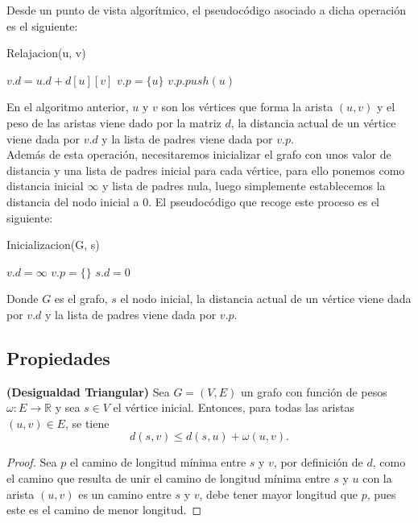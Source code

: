 Desde un punto de vista algorítmico, el pseudocódigo asociado a dicha operación es el siguiente:

\begin{breakablealgorithm}
	\caption{Relajacion(u, v)}
	\begin{algorithmic}[1]
			\State $v.d = u.d + d[u][v]$
			\State $v.p = \{u\}$
			\State $v.p.push(u)$
		\EndIf
	\end{algorithmic}
\end{breakablealgorithm}

En el algoritmo anterior, $u$ y $v$ son los vértices que forma la arista $(u,v)$ y el peso de las aristas viene dado por la matriz $d$, la distancia actual de un vértice viene dada por $v.d$ y la lista de padres viene dada por $v.p$. \\

Además de esta operación, necesitaremos inicializar el grafo con unos valor de distancia y una lista de padres inicial para cada vértice, para ello ponemos como distancia inicial $\infty$ y lista de padres nula, luego simplemente establecemos la distancia del nodo inicial a $0$. El pseudocódigo que recoge este proceso es el siguiente:

\begin{breakablealgorithm}
	\caption{Inicializacion(G, s)}
	\begin{algorithmic}[1]
			\State $v.d = \infty$
			\State $v.p = \{\}$
		\EndFor
		\State $s.d = 0$
	\end{algorithmic}
\end{breakablealgorithm}

Donde $G$ es el grafo, $s$ el nodo inicial, la distancia actual de un vértice viene dada por $v.d$ y la lista de padres viene dada por $v.p$. \\

\subsection{Propiedades}

\begin{lema}\label{lema:des_tri}
	\textbf{(Desigualdad Triangular)} Sea $G=(V,E)$ un grafo con función de pesos $\omega : E\rightarrow \mathbb{R}$ y sea $s\in V$ el vértice inicial. Entonces, para todas las aristas $(u,v)\in E$, se tiene
	$$d(s,v)\leq d(s,u)+\omega (u,v).$$
\end{lema}

\begin{proof}
	Sea $p$ el camino de longitud mínima entre $s$ y $v$, por definición de $d$, como el camino que resulta de unir el camino de longitud mínima entre $s$ y $u$ con la arista $(u,v)$ es un camino entre $s$ y $v$, debe tener mayor longitud que $p$, pues este es el camino de menor longitud.
\end{proof}


